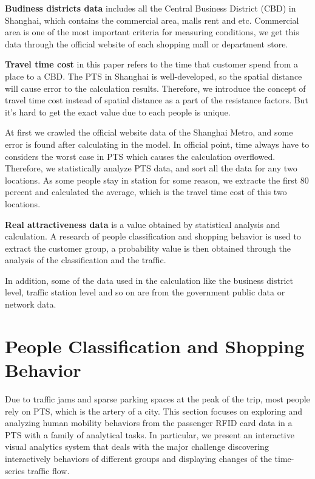 \documentclass[journal]{IEEEtran}
\begin{document}
\textbf{Budiness districts data} includes all the Central Business District (CBD) in Shanghai, which contains the commercial area, malls rent and etc. Commercial area is one of the most important criteria for measuring conditions, we get this data through the official website of each shopping mall or department store.

\textbf{Travel time cost} in this paper refers to the time that customer spend from a place to a CBD. The PTS in Shanghai is well-developed, so the spatial distance will cause error to the calculation results. Therefore, we introduce the concept of travel time cost instead of spatial distance as a part of the resistance factors. But it's hard to get the exact value due to each people is unique.

At first we crawled the official website data of the Shanghai Metro, and some error is found after calculating in the model. In official point, time always have to considers the worst case in PTS which causes the calculation overflowed. Therefore, we statistically analyze PTS data, and sort all the data for any two locations. As some people stay in station for some reason, we extracte the first 80 percent and calculated the average, which is the travel time cost of this two locations.

\textbf{Real attractiveness data} is a value obtained by statistical analysis and calculation. A research of people classification and shopping behavior is used to extract the customer group, a probability value is then obtained through the analysis of the classification and the traffic.

In addition, some of the data used in the calculation like the business district level, traffic station level and so on are from the government public data or network data.









\section{People Classification and Shopping Behavior}

Due to traffic jams and sparse parking spaces at the peak of the trip, most people rely on PTS, which is the artery of a city. This section focuses on exploring and analyzing human mobility behaviors from the passenger RFID card data in a PTS with a family of analytical tasks. In particular, we present an interactive visual analytics system that deals with the major challenge discovering interactively behaviors of different groups and displaying changes of the time-series traffic flow. 
\end{document}

